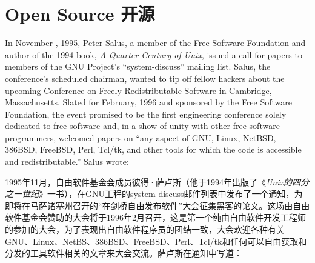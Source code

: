 
\chapter{\ifdefined\eng
Open Source
\fi
\ifdefined\chs
开源
\fi} \label{chapter:open source}



\ifdefined\eng
In November , 1995, Peter Salus, a member of the Free Software Foundation and author of the 1994 book, \textit{A Quarter Century of Unix}, issued a call for papers to members of the GNU Project's ``system-discuss'' mailing list. Salus, the conference's scheduled chairman, wanted to tip off fellow hackers about the upcoming Conference on Freely Redistributable Software in Cambridge, Massachusetts. Slated for February, 1996 and sponsored by the Free Software Foundation, the event promised to be the first engineering conference solely dedicated to free software and, in a show of unity with other free software programmers, welcomed papers on ``any aspect of GNU, Linux, NetBSD, 386BSD, FreeBSD, Perl, Tcl/tk, and other tools for which the code is accessible and redistributable.'' Salus wrote:
\fi

\ifdefined\chs
1995年11月，自由软件基金会成员彼得·萨卢斯（他于1994年出版了《\textit{Unix的四分之一世纪}》一书），在GNU工程的system-discuss邮件列表中发布了一个通知，为即将在马萨诸塞州召开的``在剑桥自由发布软件''大会征集黑客的论文。这场由自由软件基金会赞助的大会将于1996年2月召开，这是第一个纯由自由软件开发工程师的参加的大会，为了表现出自由软件程序员的团结一致，大会欢迎各种有关GNU、Linux、NetBS、386BSD、FreeBSD、Perl、Tcl/tk和任何可以自由获取和分发的工具软件相关的文章来大会交流。萨卢斯在通知中写道：
\fi

